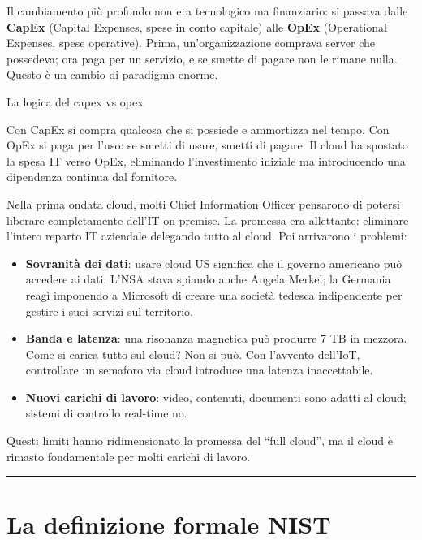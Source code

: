 \documentclass[
  italian,
  openany]{book}
\providecommand{\tightlist}{%
  \setlength{\itemsep}{0pt}\setlength{\parskip}{0pt}}
\begin{document}
Il cambiamento più profondo non era tecnologico ma finanziario: si
passava dalle \textbf{CapEx} (Capital Expenses, spese in conto capitale)
alle \textbf{OpEx} (Operational Expenses, spese operative). Prima,
un'organizzazione comprava server che possedeva; ora paga per un
servizio, e se smette di pagare non le rimane nulla. Questo è un cambio
di paradigma enorme.

\begin{callouttip}{La logica del capex vs opex}

Con CapEx si compra qualcosa che si possiede e ammortizza nel tempo. Con
OpEx si paga per l'uso: se smetti di usare, smetti di pagare. Il cloud
ha spostato la spesa IT verso OpEx, eliminando l'investimento iniziale
ma introducendo una dipendenza continua dal fornitore.

\end{callouttip}

Nella prima ondata cloud, molti Chief Information Officer pensarono di
potersi liberare completamente dell'IT on-premise. La promessa era
allettante: eliminare l'intero reparto IT aziendale delegando tutto al
cloud. Poi arrivarono i problemi:

\begin{itemize}
\tightlist
\item
  \textbf{Sovranità dei dati}: usare cloud US significa che il governo
  americano può accedere ai dati. L'NSA stava spiando anche Angela
  Merkel; la Germania reagì imponendo a Microsoft di creare una società
  tedesca indipendente per gestire i suoi servizi sul territorio.
\item
  \textbf{Banda e latenza}: una risonanza magnetica può produrre 7 TB in
  mezzora. Come si carica tutto sul cloud? Non si può. Con l'avvento
  dell'IoT, controllare un semaforo via cloud introduce una latenza
  inaccettabile.
\item
  \textbf{Nuovi carichi di lavoro}: video, contenuti, documenti sono
  adatti al cloud; sistemi di controllo real-time no.
\end{itemize}

Questi limiti hanno ridimensionato la promessa del ``full cloud'', ma il
cloud è rimasto fondamentale per molti carichi di lavoro.

\begin{center}\rule{0.5\linewidth}{0.5pt}\end{center}

\section{La definizione formale NIST}\label{la-definizione-formale-nist}
\end{document}
